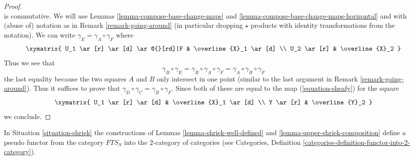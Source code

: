 \begin{proof}
$${}
$$
is commutative. We will use
Lemmas \ref{lemma-compose-base-change-maps} and
\ref{lemma-compose-base-change-maps-horizontal}
and with (abuse of) notation as in
Remark \ref{remark-going-around} (in particular
dropping $\star$ products with identity transformations
from the notation).
We can write $\gamma_E = \gamma_A \circ \gamma_F$ where
$$
\xymatrix{
U_1 \ar[r] \ar[d] \ar@{}[rd]|F & \overline{X}_1 \ar[d] \\
U_2 \ar[r] & \overline{X}_2
}
$$
Thus we see that
$$
\gamma_B \circ \gamma_E = \gamma_B \circ \gamma_A  \circ \gamma_F
= \gamma_A \circ \gamma_B \circ \gamma_F
$$
the last equality because the two squares $A$ and $B$ only
intersect in one point (similar to the last argument in
Remark \ref{remark-going-around}). Thus it suffices to prove that
$\gamma_D \circ \gamma_C = \gamma_B \circ \gamma_F$.
Since both of these are equal to the map (\ref{equation-sheafy})
for the square
$$
\xymatrix{
U_1 \ar[r] \ar[d] & \overline{X}_1 \ar[d] \\
Y \ar[r] & \overline{Y}_2
}
$$
we conclude.
\end{proof}

\begin{lemma}
\label{lemma-pseudo-functor}
In Situation \ref{situation-shriek} the constructions of
Lemmas \ref{lemma-shriek-well-defined} and \ref{lemma-upper-shriek-composition}
define a pseudo functor from the category $\textit{FTS}_S$
into the $2$-category of categories (see Categories, Definition
\ref{categories-definition-functor-into-2-category}).
\end{lemma}

